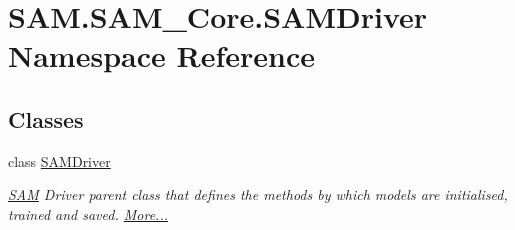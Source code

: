 \hypertarget{namespaceSAM_1_1SAM__Core_1_1SAMDriver}{}\section{S\+A\+M.\+S\+A\+M\+\_\+\+Core.\+S\+A\+M\+Driver Namespace Reference}
\label{namespaceSAM_1_1SAM__Core_1_1SAMDriver}
\subsection*{Classes}
\begin{DoxyCompactItemize}
\item 
class \hyperlink{group__icubclient__SAM__Drivers_classSAM_1_1SAM__Core_1_1SAMDriver_1_1SAMDriver}{S\+A\+M\+Driver}
\begin{DoxyCompactList}\small\item\em \hyperlink{namespaceSAM}{S\+AM} Driver parent class that defines the methods by which models are initialised, trained and saved.  \hyperlink{group__icubclient__SAM__Drivers_classSAM_1_1SAM__Core_1_1SAMDriver_1_1SAMDriver}{More...}\end{DoxyCompactList}\end{DoxyCompactItemize}
